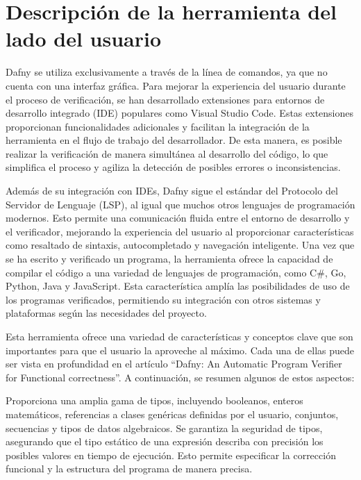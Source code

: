 \documentclass[runningheads]{llncs}
\begin{document}
\section{Descripción de la herramienta del lado del usuario}

Dafny se utiliza exclusivamente a través de la línea de comandos, ya que no cuenta con una interfaz gráfica.
Para mejorar la experiencia del usuario durante el proceso de verificación, se han desarrollado extensiones para entornos de desarrollo integrado (IDE) populares como Visual Studio Code.
Estas extensiones proporcionan funcionalidades adicionales y facilitan la integración de la herramienta en el flujo de trabajo del desarrollador.
De esta manera, es posible realizar la verificación de manera simultánea al desarrollo del código, lo que simplifica el proceso y agiliza la detección de posibles errores o inconsistencias.

Además de su integración con IDEs, Dafny sigue el estándar del Protocolo del Servidor de Lenguaje (LSP), al igual que muchos otros lenguajes de programación modernos.
Esto permite una comunicación fluida entre el entorno de desarrollo y el verificador, mejorando la experiencia del usuario al proporcionar características como resaltado de sintaxis, autocompletado y navegación inteligente.
Una vez que se ha escrito y verificado un programa, la herramienta ofrece la capacidad de compilar el código a una variedad de lenguajes de programación, como C\#, Go, Python, Java y JavaScript.
Esta característica amplía las posibilidades de uso de los programas verificados, permitiendo su integración con otros sistemas y plataformas según las necesidades del proyecto.

Esta herramienta ofrece una variedad de características y conceptos clave que son importantes para que el usuario la aproveche al máximo. 
Cada una de ellas puede ser vista en profundidad en el artículo 
``Dafny: An Automatic Program Verifier for Functional correctness''\cite{10.1007/978-3-642-17511-4_20}.
A continuación, se resumen algunos de estos aspectos:

Proporciona una amplia gama de tipos, incluyendo booleanos, enteros matemáticos, referencias a clases genéricas definidas por el usuario, conjuntos, secuencias y tipos de datos algebraicos.
Se garantiza la seguridad de tipos, asegurando que el tipo estático de una expresión describa con precisión los posibles valores en tiempo de ejecución.
Esto permite especificar la corrección funcional y la estructura del programa de manera precisa.
\end{document}
